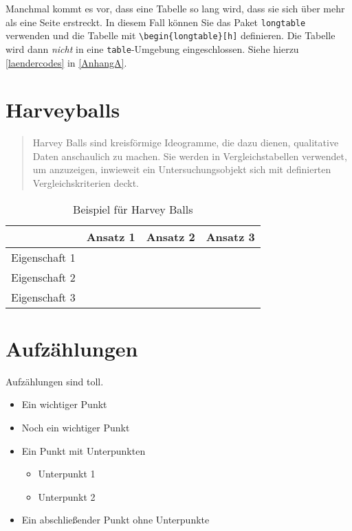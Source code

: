 Manchmal kommt es vor, dass eine Tabelle so lang wird, dass sie sich über mehr als eine Seite erstreckt. In diesem Fall können Sie das Paket \texttt{longtable} verwenden und die Tabelle mit \verb+\begin{longtable}[h]+ definieren. Die Tabelle wird dann \textit{nicht} in eine \texttt{table}-Umgebung eingeschlossen. Siehe hierzu \autoref{laendercodes} in \autoref{AnhangA}.


\section{Harveyballs}

\begin{quote}
    Harvey Balls sind kreisförmige Ideogramme, die dazu dienen, qualitative Daten anschaulich zu machen. Sie werden in Vergleichstabellen verwendet, um anzuzeigen, inwieweit ein Untersuchungsobjekt sich mit definierten Vergleichskriterien deckt. \parencite{Wikipedia_HarveyBalls}
\end{quote}

\begin{table}[ht]
  \caption{Beispiel für Harvey Balls}
  \label{tab:harveyexample}
  \centering
  \begin{tabular}{lccc}
    \toprule
    & Ansatz 1 & Ansatz 2 & Ansatz 3\\
    \midrule
    Eigenschaft 1	& \harveyBallNone & \harveyBallQuarter & \harveyBallHalf \\
    Eigenschaft 2	& \harveyBallHalf & \harveyBallThreeQuarter & \harveyBallFull \\
    Eigenschaft 3	& \harveyBallFull & \harveyBallThreeQuarter & \harveyBallQuarter\\
    \bottomrule
  \end{tabular}
\end{table}


\section{Aufzählungen}

Aufzählungen sind toll.

\begin{itemize}
  \item Ein wichtiger Punkt
  \item Noch ein wichtiger Punkt
  \item Ein Punkt mit Unterpunkten
    \begin{itemize}
      \item Unterpunkt 1
      \item Unterpunkt 2
    \end{itemize}
  \item Ein abschließender Punkt ohne Unterpunkte
\end{itemize}


